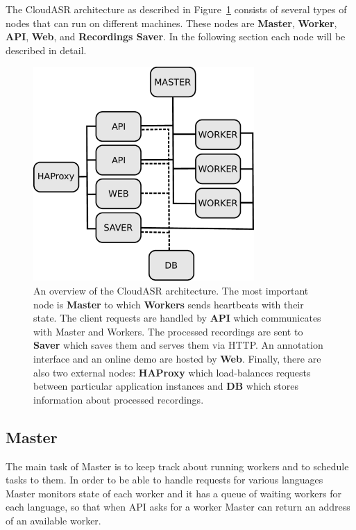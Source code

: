 The CloudASR architecture as described in Figure~\ref{fig:architecture} consists of several types of nodes that can run on different machines.
These nodes are \textbf{Master}, \textbf{Worker}, \textbf{API}, \textbf{Web},  and \textbf{Recordings Saver}.
In the following section each node will be described in detail.


\begin{figure}[h]
  \centering
  \includegraphics[width=0.75\textwidth]{./img/architecture.pdf}

  \caption{
    An overview of the CloudASR architecture.
    The most important node is \textbf{Master} to which \textbf{Workers} sends heartbeats with their state.
    The client requests are handled by \textbf{API} which communicates with Master and Workers.
    The processed recordings are sent to \textbf{Saver} which saves them and serves them via HTTP.
    An annotation interface and an online demo are hosted by \textbf{Web}.
    Finally, there are also two external nodes: \textbf{HAProxy}
      which load-balances requests between particular application instances
      and \textbf{DB} which stores information about processed recordings.
  }
  \label{fig:architecture}
\end{figure}


\subsection{Master}
The main task of Master is to keep track about running workers and to schedule tasks to them.
In order to be able to handle requests for various languages
  Master monitors state of each worker
  and it has a queue of waiting workers for each language,
    so that when API asks for a worker Master can return an address of an available worker.

